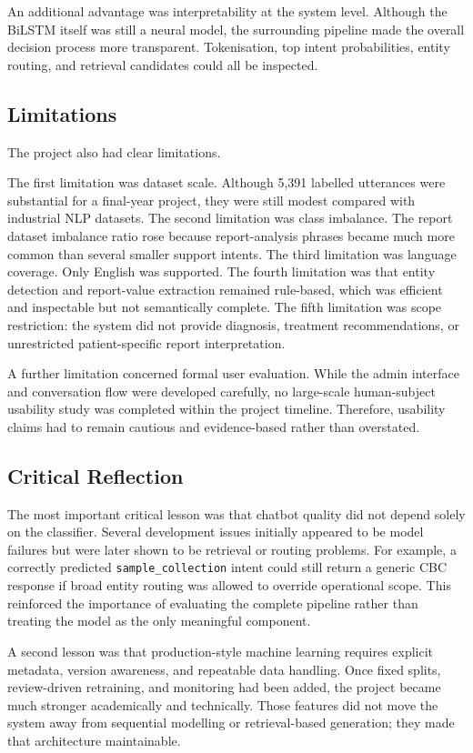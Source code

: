 An additional advantage was interpretability at the system level. Although the BiLSTM itself was still a neural model, the surrounding pipeline made the overall decision process more transparent. Tokenisation, top intent probabilities, entity routing, and retrieval candidates could all be inspected.

\subsection{Limitations}

The project also had clear limitations.

The first limitation was dataset scale. Although 5,391 labelled utterances were substantial for a final-year project, they were still modest compared with industrial NLP datasets. The second limitation was class imbalance. The report dataset imbalance ratio rose because report-analysis phrases became much more common than several smaller support intents. The third limitation was language coverage. Only English was supported. The fourth limitation was that entity detection and report-value extraction remained rule-based, which was efficient and inspectable but not semantically complete. The fifth limitation was scope restriction: the system did not provide diagnosis, treatment recommendations, or unrestricted patient-specific report interpretation.

A further limitation concerned formal user evaluation. While the admin interface and conversation flow were developed carefully, no large-scale human-subject usability study was completed within the project timeline. Therefore, usability claims had to remain cautious and evidence-based rather than overstated.

\subsection{Critical Reflection}

The most important critical lesson was that chatbot quality did not depend solely on the classifier. Several development issues initially appeared to be model failures but were later shown to be retrieval or routing problems. For example, a correctly predicted \texttt{sample\_collection} intent could still return a generic CBC response if broad entity routing was allowed to override operational scope. This reinforced the importance of evaluating the complete pipeline rather than treating the model as the only meaningful component.

A second lesson was that production-style machine learning requires explicit metadata, version awareness, and repeatable data handling. Once fixed splits, review-driven retraining, and monitoring had been added, the project became much stronger academically and technically. Those features did not move the system away from sequential modelling or retrieval-based generation; they made that architecture maintainable.

